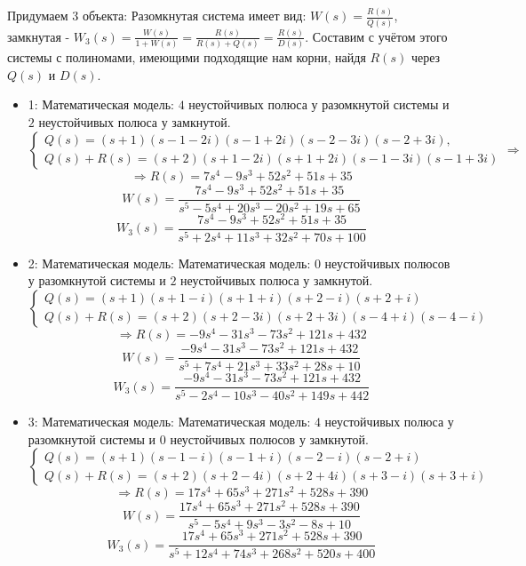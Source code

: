 Придумаем 3 объекта:
Разомкнутая система имеет вид: $W(s)=\frac{R(s)}{Q(s)}$,
замкнутая - $W_3(s)=\frac{W(s)}{1+W(s)}=\frac{R(s)}{R(s)+Q(s)}=\frac{R(s)}{D(s)}$. Составим с учётом этого системы с полиномами, имеющими подходящие нам корни, найдя $R(s)$ через $Q(s)$ и $D(s)$.

\begin{itemize}
    \item 1:
Математическая модель: $4$ неустойчивых полюса у разомкнутой системы и $2$ неустойчивых полюса у замкнутой.
$$
\begin{cases}
Q(s)= (s+1)(s-1-2i)(s-1+2i)(s-2-3i)(s-2+3i),\\
Q(s)+R(s)= (s+2)(s+1-2i)(s+1+2i)(s-1-3i)(s-1+3i)
\end{cases}\Rightarrow
$$$$
\Rightarrow R(s) = 7 s^4 - 9 s^3 + 52 s^2 + 51 s + 35
$$$$
W(s)=\frac{7 s^4 - 9 s^3 + 52 s^2 + 51 s + 35}{s^5 - 5 s^4 + 20 s^3 - 20 s^2 + 19 s + 65}
$$$$
W_3(s)=\frac{7 s^4 - 9 s^3 + 52 s^2 + 51 s + 35}{s^5 + 2 s^4 + 11 s^3 + 32 s^2 + 70 s + 100}
$$


\item 2:
Математическая модель:
Математическая модель: $0$ неустойчивых полюсов у разомкнутой системы и $2$ неустойчивых полюса у замкнутой.
$$
\begin{cases}
    Q(s)=(s+1)(s+1-i)(s+1+i)(s+2-i)(s+2+i) \\
    Q(s)+R(s)=(s+2)(s+2-3i)(s+2+3i)(s-4+i)(s-4-i)
\end{cases}
$$$$
\Rightarrow R(s) = -9 s^4 - 31 s^3 - 73 s^2 + 121 s + 432
$$$$
W(s)=\frac{-9 s^4 - 31 s^3 - 73 s^2 + 121 s + 432}{s^5 + 7 s^4 + 21 s^3 + 33 s^2 + 28 s + 10}
$$$$
W_3(s)=\frac{-9 s^4 - 31 s^3 - 73 s^2 + 121 s + 432}{s^5 - 2 s^4 - 10 s^3 - 40 s^2 + 149 s + 442}
$$


\item 3:
Математическая модель:
Математическая модель: $4$ неустойчивых полюса у разомкнутой системы и $0$ неустойчивых полюсов у замкнутой.
$$
\begin{cases}
    Q(s)=(s+1)(s-1-i)(s-1+i)(s-2-i)(s-2+i) \\
    Q(s)+R(s)=(s+2)(s+2-4i)(s+2+4i)(s+3-i)(s+3+i)
\end{cases}
$$$$
\Rightarrow R(s) = 17 s^4 + 65 s^3 + 271 s^2 + 528 s + 390
$$$$
W(s)=\frac{17 s^4 + 65 s^3 + 271 s^2 + 528 s + 390}{s^5 - 5 s^4 + 9 s^3 - 3 s^2 - 8 s + 10}
$$$$
W_3(s)=\frac{17 s^4 + 65 s^3 + 271 s^2 + 528 s + 390}{s^5 + 12 s^4 + 74 s^3 + 268 s^2 + 520 s + 400}
$$


\end{itemize}


